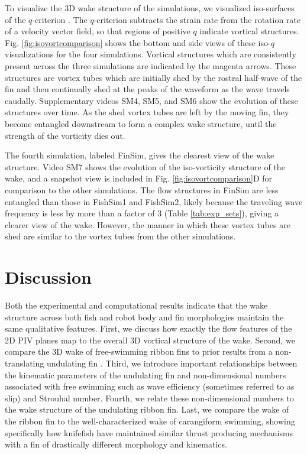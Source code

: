 \documentclass[onecolumn]{IEEEtran}
\begin{document}
To visualize the 3D wake structure of the simulations, we visualized
iso-surfaces of the $q$-criterion \citep*{Bora08a}. The $q$-criterion
subtracts the strain rate from the rotation rate of a velocity vector
field, so that regions of positive $q$ indicate vortical structures. Fig.
\ref{fig:isovortcomparison} shows the bottom and side views of these iso-$q$
visualizations for the four simulations. Vortical
structures which are consistently present across the three simulations are indicated by the magenta arrows.
These structures are vortex tubes which are initially shed by the rostral
half-wave of the fin and then continually shed at the peaks of the
waveform as the wave travels caudally. Supplementary videos SM4, SM5, and
SM6 show the evolution of these structures over time. As the shed vortex
tubes are left by the moving fin, they become entangled downstream to form
a complex wake structure, until the strength of the vorticity dies out.

The fourth simulation, labeled FinSim, gives the clearest view of the
wake structure. Video SM7 shows the evolution of the iso-vorticity
structure of the wake, and a snapshot view is included in Fig.
\ref{fig:isovortcomparison}D for comparison to the other simulations.
The flow structures in FinSim are less entangled than those in FishSim1 and FishSim2, 
likely because the traveling wave frequency is less by more than a 
factor of 3 (Table \ref{tab:exp_sets}), giving a clearer view of
the wake. However, the manner in which these vortex tubes are shed are
similar to the vortex tubes from the other simulations.


\section{Discussion}

Both the experimental and computational results indicate that the wake
structure across both fish and robot body and fin morphologies maintain
the same qualitative features. First, we discuss how exactly the flow features of the 2D
PIV planes map to the overall 3D vortical structure of the wake.  
Second, we compare the 3D wake of free-swimming ribbon fins to prior 
results from a non-translating undulating fin \citep*{Shir08a}.
Third, we introduce important relationships between the kinematic
parameters of the undulating fin and non-dimensional numbers associated
with free swimming such as wave efficiency (sometimes referred to as slip)
and Strouhal number. Fourth, we relate these non-dimensional numbers
to the wake structure of the undulating ribbon fin. Last, we compare
the wake of the ribbon fin to the well-characterized wake of carangiform
swimming, showing specifically how knifefish have maintained similar
thrust producing mechanisms with a fin of drastically different morphology
and kinematics.
\end{document}

